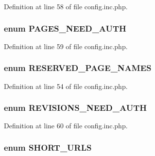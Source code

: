 Definition at line 58 of file config.inc.php.

\hypertarget{config_8inc_8php_a11f5534165e1764860b16cc7215b2141}{
\subsubsection[{PAGES\_\-NEED\_\-AUTH}]{\setlength{\rightskip}{0pt plus 5cm}enum {\bf PAGES\_\-NEED\_\-AUTH}}}
\label{config_8inc_8php_a11f5534165e1764860b16cc7215b2141}


Definition at line 59 of file config.inc.php.

\hypertarget{config_8inc_8php_a9b61a7295e29797458d957ae0640c601}{
\subsubsection[{RESERVED\_\-PAGE\_\-NAMES}]{\setlength{\rightskip}{0pt plus 5cm}enum {\bf RESERVED\_\-PAGE\_\-NAMES}}}
\label{config_8inc_8php_a9b61a7295e29797458d957ae0640c601}


Definition at line 54 of file config.inc.php.

\hypertarget{config_8inc_8php_a67b9479d334a4e6c33c0bc3505b3eb5e}{
\subsubsection[{REVISIONS\_\-NEED\_\-AUTH}]{\setlength{\rightskip}{0pt plus 5cm}enum {\bf REVISIONS\_\-NEED\_\-AUTH}}}
\label{config_8inc_8php_a67b9479d334a4e6c33c0bc3505b3eb5e}


Definition at line 60 of file config.inc.php.

\hypertarget{config_8inc_8php_a377ac3321785e25215435e8d9802bc34}{
\subsubsection[{SHORT\_\-URLS}]{\setlength{\rightskip}{0pt plus 5cm}enum {\bf SHORT\_\-URLS}}}
\label{config_8inc_8php_a377ac3321785e25215435e8d9802bc34}



